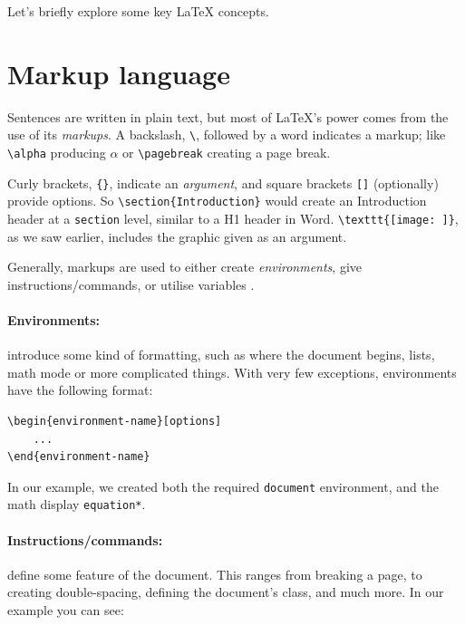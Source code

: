         Let's briefly explore some key \LaTeX{} concepts.
\section{Markup language}
    Sentences are written in plain text, but most of LaTeX's power comes from the use of its \emph{markups}.
    A backslash, \verb|\|, followed by a word indicates a markup; like \verb|\alpha| producing \( \alpha \) or \verb|\pagebreak| creating a page break.
    
    Curly brackets, \verb|{}|, indicate an \emph{argument}, and square brackets \verb|[]| (optionally) provide options.
    So \verb|\section{Introduction}| would create an Introduction header at a \texttt{section} level, similar to a H1 header in Word.
    \verb|\texttt{[image: ]}|, as we saw earlier, includes the graphic given as an argument.

    Generally, markups are used to either create \emph{environments}, give instructions/commands, or utilise variables \footnotemark.

    \paragraph{Environments:}
    introduce some kind of formatting, such as where the document begins, lists, math mode or more complicated things.
    With very few exceptions, environments have the following format:
        
    \begin{lstlisting}
\begin{environment-name}[options]
    ...
\end{environment-name}
    \end{lstlisting}
        
    In our example, we created both the required \texttt{document} environment, and the math display \texttt{equation*}.
        
    \paragraph{Instructions/commands:}
    define some feature of the document. This ranges from breaking a page, to creating double-spacing, defining the document's class, and much more. In our example you can see:

